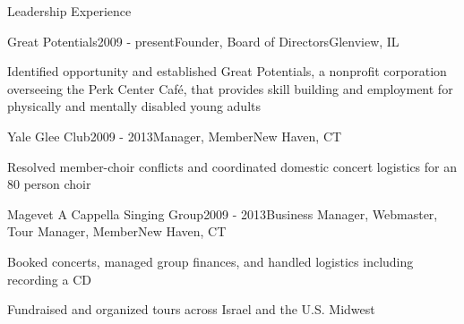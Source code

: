 \documentclass{resume} %
\begin{document}
\begin{rSection}{Leadership Experience}

\begin{rSubsection}{Great Potentials}{2009 - present}{Founder, Board of Directors}{Glenview, IL}
\item Identified opportunity and established Great Potentials, a nonprofit corporation overseeing the Perk Center Caf\'{e}, that provides skill building and employment for physically and mentally disabled young adults
\end{rSubsection}


\begin{rSubsection}{Yale Glee Club}{2009 - 2013}{Manager, Member}{New Haven, CT}
\item Resolved member-choir conflicts and coordinated domestic concert logistics for an 80 person choir
\end{rSubsection}


\begin{rSubsection}{Magevet A Cappella Singing Group}{2009 - 2013}{Business Manager, Webmaster, Tour Manager, Member}{New Haven, CT}
\item Booked concerts, managed group finances, and handled logistics including recording a CD
\item Fundraised and organized tours across Israel and the U.S. Midwest
\end{rSubsection}


\end{rSection}

\end{document}
